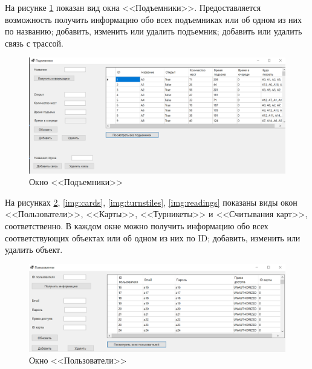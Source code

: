 На рисунке \ref{img:lifts} показан вид окна <<Подъемники>>. Предоставляется возможность получить информацию обо всех подъемниках или об одном из них по названию; добавить, изменить или удалить подъемник; добавить или удалить связь с трассой.

\clearpage
\begin{figure}[h!]
	\begin{center}
		\includegraphics[scale=0.55]{../imgs/int/lifts.png}
	\end{center}
	\captionsetup{justification=centering}
	\caption{Окно <<Подъемники>>}
	\label{img:lifts}
\end{figure}

На рисунках \ref{img:users}, \ref{img:cards}, \ref{img:turnstiles}, \ref{img:readings} показаны виды окон <<Пользователи>>, <<Карты>>, <<Турникеты>> и <<Считывания карт>>, соответственно. В каждом окне можно получить информацию обо всех соответствующих объектах или об одном из них по ID; добавить, изменить или удалить объект.

\begin{figure}[h!]
	\begin{center}
		\includegraphics[scale=0.6]{../imgs/int/users.png}
	\end{center}
	\captionsetup{justification=centering}
	\caption{Окно <<Пользователи>>}
	\label{img:users}
\end{figure}

